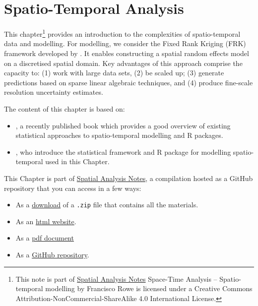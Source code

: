 \documentclass[
]{book}
\providecommand{\tightlist}{%
  \setlength{\itemsep}{0pt}\setlength{\parskip}{0pt}}
\begin{document}
\hypertarget{sta}{%
\chapter{Spatio-Temporal Analysis}\label{sta}}

This chapter\footnote{This note is part of \href{index.html}{Spatial Analysis Notes} {Space-Time Analysis -- Spatio-temporal modelling} by Francisco Rowe is licensed under a Creative Commons Attribution-NonCommercial-ShareAlike 4.0 International License.} provides an introduction to the complexities of spatio-temporal data and modelling. For modelling, we consider the Fixed Rank Kriging (FRK) framework developed by \citet{cressie2008fixed}. It enables constructing a spatial random effects model on a discretised spatial domain. Key advantages of this approach comprise the capacity to: (1) work with large data sets, (2) be scaled up; (3) generate predictions based on sparse linear algebraic techniques, and (4) produce fine-scale resolution uncertainty estimates.

The content of this chapter is based on:

\begin{itemize}
\item
  \citet{wikle2019spatio}, a recently published book which provides a good overview of existing statistical approaches to spatio-temporal modelling and R packages.
\item
  \citet{zammit2017frk}, who introduce the statistical framework and R package for modelling spatio-temporal used in this Chapter.
\end{itemize}

This Chapter is part of \href{index.html}{Spatial Analysis Notes}, a compilation hosted as a GitHub repository that you can access in a few ways:

\begin{itemize}
\tightlist
\item
  As a \href{https://github.com/GDSL-UL/san/archive/master.zip}{download} of a \texttt{.zip} file that contains all the materials.
\item
  As an \href{https://gdsl-ul.github.io/san/spatio-temporal-analysis.html}{html
  website}.
\item
  As a \href{https://gdsl-ul.github.io/san/spatial_analysis_notes.pdf}{pdf
  document}
\item
  As a \href{https://github.com/GDSL-UL/san}{GitHub repository}.
\end{itemize}
\end{document}
